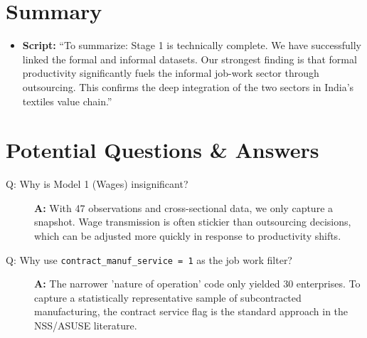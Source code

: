 \documentclass[11pt]{article}
\begin{document}
\section{Summary}
\begin{itemize}
    \item \textbf{Script:} ``To summarize: Stage 1 is technically complete. We have successfully linked the formal and informal datasets. Our strongest finding is that formal productivity significantly fuels the informal job-work sector through outsourcing. This confirms the deep integration of the two sectors in India's textiles value chain.''
\end{itemize}

\section*{Potential Questions \& Answers}
\begin{description}
    \item[Q: Why is Model 1 (Wages) insignificant?] \textbf{A:} With 47 observations and cross-sectional data, we only capture a snapshot. Wage transmission is often stickier than outsourcing decisions, which can be adjusted more quickly in response to productivity shifts.
    \item[Q: Why use \texttt{contract\_manuf\_service = 1} as the job work filter?] \textbf{A:} The narrower 'nature of operation' code only yielded 30 enterprises. To capture a statistically representative sample of subcontracted manufacturing, the contract service flag is the standard approach in the NSS/ASUSE literature.
\end{description}
\end{document}
